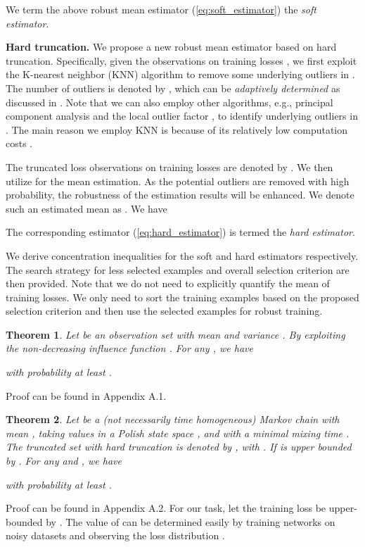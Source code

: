 \documentclass[11pt]{article}
\newtheorem{theorem}{Theorem}
\begin{document}
We term the above robust mean estimator (\ref{eq:soft_estimator}) the \textit{soft estimator}. 

\textbf{Hard truncation.} We propose a new robust mean estimator based on hard truncation. Specifically, given the observations on training losses , we first exploit the K-nearest neighbor (KNN) algorithm \citep{liao2002use} to remove some underlying outliers in . The number of outliers is denoted by , which can be \textit{adaptively determined} as discussed in \citep{zhao2019pyod}. 
Note that we can also employ other algorithms, e.g., principal component analysis \citep{shyu2003novel} and the local outlier factor \citep{breunig2000lof}, to identify underlying outliers in . The main reason we employ KNN is because of its relatively low computation costs \citep{zhao2019pyod}. 

The truncated loss observations on training losses are denoted by . We then utilize  for the mean estimation. As the potential outliers are removed with high probability, the robustness of the estimation results will be enhanced. We denote such an estimated mean as . We have 

The corresponding estimator (\ref{eq:hard_estimator}) is termed the \textit{hard estimator}.

We derive concentration inequalities for the soft and hard estimators respectively. The search strategy for less selected examples and overall selection criterion are then provided. Note that we do not need to explicitly quantify the mean of training losses. We only need to sort the training examples based on the proposed selection criterion and then use the selected examples for robust training.

\begin{theorem}
Let  be an observation set with mean  and variance . By exploiting the non-decreasing influence function . For any , we have 

with probability at least .
\end{theorem}
Proof can be found in Appendix A.1. 

\begin{theorem}
Let  be a (not necessarily time homogeneous) Markov chain with mean , taking values
in a Polish state space , and with a minimal mixing time . The truncated set with hard truncation is denoted by , with . If  is upper bounded by . For any  and , we have 

with probability at least .
\end{theorem}
Proof can be found in Appendix A.2. For our task, let the training loss be upper-bounded by . The value of  can be determined easily by training networks on noisy datasets and observing the loss distribution \citep{arazo2019unsupervised}. 
\end{document}
